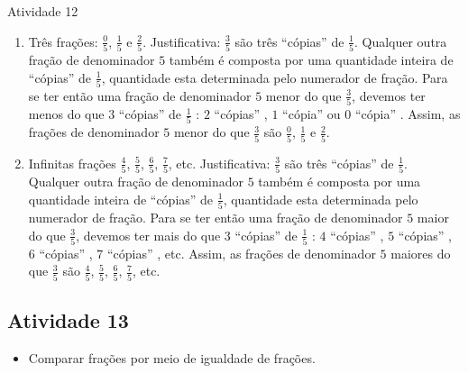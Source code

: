 \begin{multicols}{2}
\begin{resposta*}{Atividade 12}
\begin{enumerate} [\quad a)] %
    \item       Três frações:       $\frac{0}{5}$,       $\frac{1}{5}$       e
    $\frac{2}{5}$. Justificativa:       $\frac{3}{5}$       são três
``cópias''       de       $\frac{1}{5}$. Qualquer outra fração de denominador
   $5$       também é composta por uma quantidade inteira de       ``cópias''
   de       $\frac{1}{5}$, quantidade esta determinada pelo numerador de fração.
Para se ter então uma fração de denominador       $5$       menor do que
$\frac{3}{5}$, devemos ter menos do que       $3$             ``cópias''
de       $\frac{1}{5}$      :       $2$             ``cópias''      ,       $1$
           ``cópia''       ou       $0$             ``cópia''      . Assim, as
frações de denominador       $5$       menor do que       $\frac{3}{5}$
são       $\frac{0}{5}$,       $\frac{1}{5}$       e       $\frac{2}{5}$.
    \item       Infinitas frações       $\frac{4}{5}$,       $\frac{5}{5}$,
 $\frac{6}{5}$,       $\frac{7}{5}$, etc. Justificativa:       $\frac{3}{5}$
  são três       ``cópias''       de       $\frac{1}{5}$. Qualquer outra fração
de denominador       $5$       também é composta por uma quantidade inteira de
    ``cópias''       de       $\frac{1}{5}$, quantidade esta determinada pelo
numerador de fração. Para se ter então uma fração de denominador       $5$
maior do que       $\frac{3}{5}$, devemos ter mais do que       $3$
``cópias''       de       $\frac{1}{5}$      :       $4$             ``cópias''
    ,       $5$             ``cópias''      ,       $6$             ``cópias''
   ,       $7$             ``cópias''      , etc. Assim, as frações de
denominador       $5$       maiores do que       $\frac{3}{5}$       são
$\frac{4}{5}$,       $\frac{5}{5}$,       $\frac{6}{5}$,       $\frac{7}{5}$,
etc.
\end{enumerate} %

\end{resposta*}



\subsection{Atividade 13}

\begin{itemize} %
    \item       Comparar frações por meio de igualdade de frações.
\end{itemize} %



\end{multicols}
